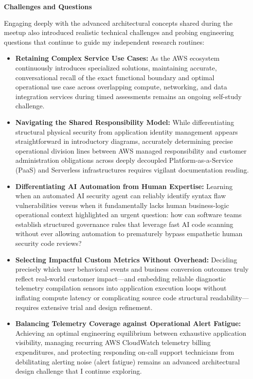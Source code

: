 \vspace{0.5em}\noindent\textbf{Challenges and Questions}\par

Engaging deeply with the advanced architectural concepts shared during
the meetup also introduced realistic technical challenges and probing
engineering questions that continue to guide my independent research
routines:

\begin{itemize}
\tightlist
\item
  \textbf{Retaining Complex Service Use Cases:} As the AWS ecosystem
  continuously introduces specialized solutions, maintaining accurate,
  conversational recall of the exact functional boundary and optimal
  operational use case across overlapping compute, networking, and data
  integration services during timed assessments remains an ongoing
  self-study challenge.
\item
  \textbf{Navigating the Shared Responsibility Model:} While
  differentiating structural physical security from application identity
  management appears straightforward in introductory diagrams,
  accurately determining precise operational division lines between AWS
  managed responsibility and customer administration obligations across
  deeply decoupled Platform-as-a-Service (PaaS) and Serverless
  infrastructures requires vigilant documentation reading.
\item
  \textbf{Differentiating AI Automation from Human Expertise:} Learning
  when an automated AI security agent can reliably identify syntax flaw
  vulnerabilities versus when it fundamentally lacks human
  business-logic operational context highlighted an urgent question: how
  can software teams establish structured governance rules that leverage
  fast AI code scanning without ever allowing automation to prematurely
  bypass empathetic human security code reviews?
\item
  \textbf{Selecting Impactful Custom Metrics Without Overhead:} Deciding
  precisely which user behavioral events and business conversion
  outcomes truly reflect real-world customer impact---and embedding
  reliable diagnostic telemetry compilation sensors into application
  execution loops without inflating compute latency or complicating
  source code structural readability---requires extensive trial and
  design refinement.
\item
  \textbf{Balancing Telemetry Coverage against Operational Alert
  Fatigue:} Achieving an optimal engineering equilibrium between
  exhaustive application visibility, managing recurring AWS CloudWatch
  telemetry billing expenditures, and protecting responding on-call
  support technicians from debilitating alerting noise (alert fatigue)
  remains an advanced architectural design challenge that I continue
  exploring.
\end{itemize}

